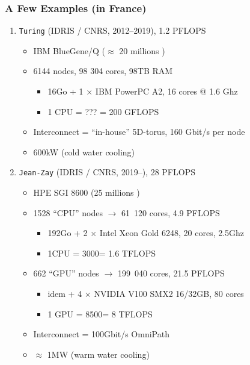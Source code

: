\documentclass[xcolor={x11names,svgnames,psnames}]{beamer}
\newcommand{\euro}{\EUR\xspace}
\begin{document}
\begin{frame}
  \frametitle{A Few Examples (in France)}

  \begin{enumerate}
  \item \texttt{Turing} (IDRIS / CNRS, 2012--2019), 1.2 PFLOPS
    \begin{itemize}
    \item IBM BlueGene/Q ($\approx$ 20 millions \euro)
    \item 6144 nodes, 98 304 cores, 98TB RAM
      \begin{itemize}
      \item 16Go + 1 $\times$ IBM PowerPC A2, 16 cores @ 1.6 Ghz
      \item 1 CPU = ??? \euro = 200 GFLOPS
      \end{itemize}
    \item Interconnect = ``in-house'' 5D-torus, 160 Gbit/s per node
    \item 600kW (cold water cooling)
    \end{itemize}

    \medskip\pause

  \item<2-> \texttt{Jean-Zay} (IDRIS / CNRS, 2019--), 28 PFLOPS
    \begin{itemize}
    \item HPE SGI 8600 (25 millions \euro)
    \item 1528 ``CPU'' nodes $\rightarrow$ 61~120 cores, 4.9 PFLOPS
      \begin{itemize}
        \item 192Go + 2 $\times$ Intel Xeon Gold 6248, 20 cores, 2.5Ghz
        \item 1CPU = 3000\euro = 1.6 TFLOPS
        \end{itemize}
    \item<3-> 662 ``GPU'' nodes  $\rightarrow$ 199~040 cores, 21.5 PFLOPS
      \begin{itemize}
      \item idem + 4 $\times$ NVIDIA V100 SMX2 16/32GB, 80 cores
      \item 1 GPU = 8500\euro = 8 TFLOPS
      \end{itemize}
    \item Interconnect = 100Gbit/s OmniPath 
    \item $\approx$ 1MW (warm water cooling)
    \end{itemize}
  \end{enumerate}
\end{frame}
\end{document}

